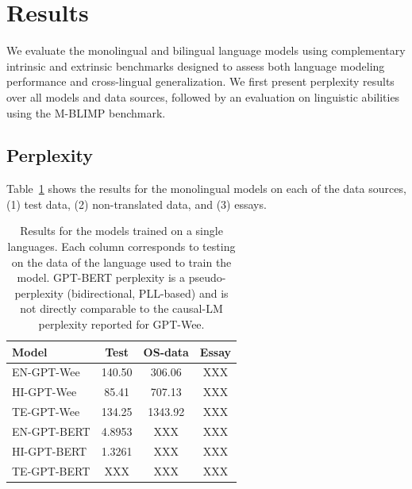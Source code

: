 \documentclass[11pt]{article}
\begin{document}
\section{Results}

We evaluate the monolingual and bilingual language models using complementary intrinsic and extrinsic benchmarks designed to assess both language modeling performance and cross-lingual generalization. We first present perplexity results over all models and data sources, followed by an evaluation on linguistic abilities using the M-BLIMP benchmark.

\subsection{Perplexity}

Table~\ref{tb:mono} shows the results for the monolingual models on each of the data sources, (1) test data, (2) non-translated data, and (3) essays.



\begin{table}[t]
\centering
\footnotesize
\begin{tabular}{lccc}
\hline
Model& Test & OS-data & Essay \\
\hline
EN-GPT-Wee & 140.50 & 306.06 & XXX \\
HI-GPT-Wee & 85.41 & 707.13 & XXX \\
TE-GPT-Wee & 134.25 & 1343.92 & XXX \\
\hline
EN-GPT-BERT & 4.8953 & XXX & XXX \\
HI-GPT-BERT & 1.3261 & XXX & XXX \\
TE-GPT-BERT & XXX & XXX & XXX \\
\hline
\end{tabular}%
\caption{Results for the models trained on a single languages. Each column corresponds to testing on the data of the language used to train the model. GPT-BERT perplexity is a pseudo-perplexity (bidirectional, PLL-based) and is not directly comparable to the causal-LM perplexity reported for GPT-Wee.}
\label{tb:mono}
\end{table}
\end{document}

